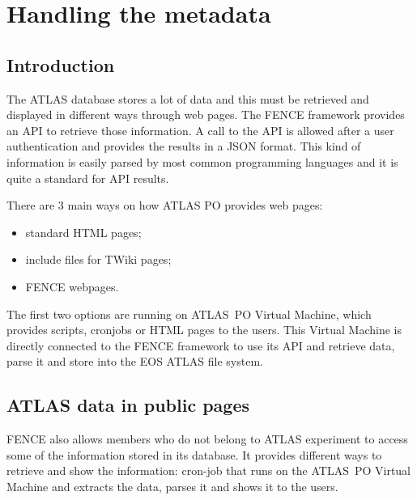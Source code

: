 
\section{Handling the metadata}
\label{sec:Handling_the_metadata}

\subsection{Introduction}

The ATLAS database stores a lot of data and this must be retrieved and displayed in different ways through web pages.
The FENCE framework provides an API to retrieve those information.
A call to the API is allowed after a user authentication and provides the results in a JSON format.
This kind of information is easily parsed by most common programming languages and it is quite a standard for API results.
 
There are 3 main ways on how ATLAS PO provides web pages:

\begin{itemize}
\item standard HTML pages;
\item include files for TWiki pages;
\item FENCE webpages.
\end{itemize}

The first two options are running on ATLAS~PO Virtual Machine, which provides scripts, cronjobs or HTML pages to the users.
This Virtual Machine is directly connected to the FENCE framework to use its API and retrieve data, parse it and store into the EOS ATLAS file system.


\subsection{ATLAS data in public pages}
\label{sec:ATLAS_data_in_public_pages}

FENCE also allows members who do not belong to ATLAS experiment to access some of the information stored in its database.
It provides different ways to retrieve and show the information: cron-job that runs on the ATLAS~PO Virtual Machine and extracts the data, parses it and shows it to the users.
 
